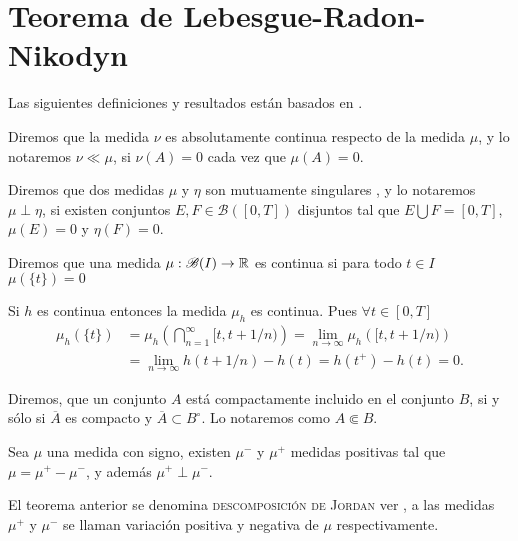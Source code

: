 \section{Teorema de Lebesgue-Radon-Nikodyn}
Las siguientes definiciones y resultados están basados en \cite[Capitulo 3]{folland}.
\begin{defi}
	Diremos que la medida $\nu$ es absolutamente continua  respecto de la medida $\mu$, y lo notaremos $\nu\ll\mu$\index[Simbolo]{$\ll$}, si $\nu(A)=0$ cada vez que  $\mu(A)=0$.
\end{defi}
\begin{defi}
	Diremos que dos medidas $\mu$ y $\eta$ son mutuamente singulares , y lo notaremos $\mu\perp \eta$,  si existen conjuntos $E,F\in\mathscr{B}([0,T])$ disjuntos tal que $E\bigcup F=[0,T]$, $\mu(E)=0$ y $\eta(F)=0$. \index[Simbolo]{$\perp$}
\end{defi}
\begin{defi}
	Diremos que una medida $\mu:\mathscr{B}(I)\to \mathbb{R}$ es continua  si para todo $t\in I$ $\mu(\{t\})=0$
\end{defi}
\begin{obs}
	Si $h$ es continua entonces la medida $\mu_{h}$ es continua. Pues $\forall t\in[0,T]$
 \begin{equation*}
	\begin{split}
		\mu_{h}(\{t\})&= \mu_{h}\left( \bigcap_{n=1}^{\infty}[t,t+1/n)\right)=\lim_{n\to \infty}\mu_{h}\left( [t,t+1/n)\right)\\&=\lim_{n\to \infty}h(t+1/n)-h(t)=h(t^+)-h(t)=0.
	\end{split}
 \end{equation*}
\end{obs}

\begin{defi}
	Diremos, que un conjunto $A$ está compactamente incluido  en el conjunto $B$, si y sólo si $\overline{A}$ es compacto y $\overline{A}\subset B^\circ$. Lo notaremos como $A\Subset B$.
	\index[Simbolo]{$\Subset$}
 \end{defi}
\begin{thm}
    Sea $\mu$ una medida con signo, existen $\mu^-$ y $\mu^+$ medidas positivas tal que $\mu=\mu^+-\mu^-$, y además $\mu^+\perp \mu^-$.\index[Simbolo]{$\mu^+$}\index[Simbolo]{$\mu^-$}
\end{thm}
El teorema anterior se denomina \textsc{descomposición de Jordan} ver \cite[Capitulo 3.1]{folland} , a las medidas $\mu^+$ y $\mu^-$ se llaman variación positiva y negativa de $\mu$ respectivamente.

